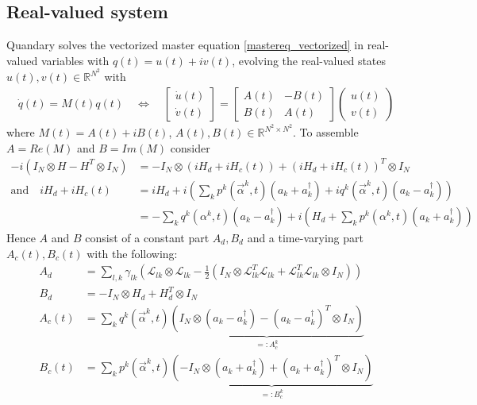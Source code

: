 \documentclass[11pt]{article}
\newcommand{\Ell}{\mathcal{L}}
\newcommand{\R}{\mathds{R}}
\begin{document}
  \subsection{Real-valued system}
   Quandary solves the vectorized master equation \eqref{mastereq_vectorized} in
   real-valued variables with $q(t) = u(t) + iv(t)$, evolving the real-valued
   states $u(t), v(t)\in \R^{N^2}$ with
   \begin{align}
     \dot q(t) = M(t) q(t) \quad \Leftrightarrow \quad \begin{bmatrix} \dot u(t) \\ \dot v(t) \end{bmatrix} = 
   \begin{bmatrix} A(t) & -B(t) \\ B(t) & A(t) \end{bmatrix} 
   \begin{pmatrix} u(t) \\ v(t) \end{pmatrix} 
   \label{realvaluedODE}
   \end{align}
   where $M(t) = A(t) + i B(t)$, $A(t), B(t)\in \R^{N^2\times N^2}$. To assemble
   $A = Re(M)$ and $B = Im(M)$ consider
   \begin{align}
     -i(I_N \otimes H - H^T \otimes I_N) &= -I_N \otimes \left(iH_d +
     iH_c(t)\right) + \left(iH_d + iH_c(t)\right)^T \otimes I_N \\
     \text{and} \quad iH_d + iH_c(t) &= i H_d + i\left( \sum_k
     p^k(\vec{\alpha}^k,t)(a_k + a_k^{\dagger}) + iq^k(\vec{\alpha}^k,t)(a_k -
     a_k^{\dagger})\right) \\
                    &= - \sum_k q^k(\alpha^k,t)(a_k - a_k^{\dagger}) + i\left(
                    H_d + \sum_k p^k(\alpha^k,t)(a_k+a_k^{\dagger}) \right) 
   \end{align}
   Hence $A$ and $B$ consist of a constant part $A_d, B_d$ and a time-varying
   part $A_c(t), B_c(t)$ with the following:
   \begin{align}
     A_d &=  \sum_{l,k}\gamma_{lk} \left( \Ell_{lk}\otimes\Ell_{lk} -
     \frac 1 2 \left(I_N \otimes \Ell_{lk}^T\Ell_{lk} +
     \Ell_{lk}^T\Ell_{lk}\otimes I_N\right) \right)\\
     B_d &= -I_N \otimes H_d + H_d^T \otimes I_N \\
     A_c(t) &= \sum_k q^k(\vec{\alpha}^k,t) \underbrace{\left( I_N \otimes
     \left(a_k - a_k^{\dagger}\right) - \left(a_k -
     a_k^{\dagger}\right)^T\otimes I_N \right)}_{=:A_c^k} \\
     B_c(t) &= \sum_k p^k(\vec{\alpha}^k,t) \underbrace{\left( - I_N \otimes
     \left(a_k + a_k^{\dagger}\right) + \left(a_k +
     a_k^{\dagger}\right)^T\otimes I_N \right)}_{=:B_c^k} 
   \end{align}
\end{document}
